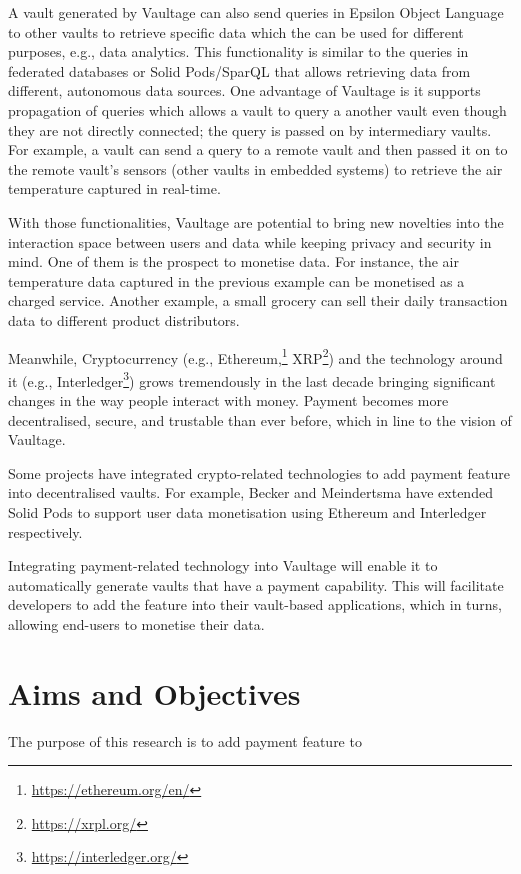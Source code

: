 \documentclass[]{article}
\begin{document}
A vault generated by Vaultage can also send queries in Epsilon Object Language \cite{epsilon} to other vaults to retrieve specific data which the can be used for different purposes, e.g., data analytics. This functionality is similar to the queries in federated databases \cite{db2} or Solid Pods/SparQL \cite{comunica} that allows retrieving data from different, autonomous data sources. One advantage of Vaultage is it supports propagation of queries which allows a vault to query a another vault even though they are not directly connected; the query is passed on by intermediary vaults. For example, a vault can send a query to a remote vault and then passed it on to the remote vault's sensors (other vaults in embedded systems) to retrieve the air temperature captured in real-time. 

With those functionalities, Vaultage are potential to bring new novelties into the interaction space between users and data while keeping privacy and security in mind. One of them  is the prospect to monetise data. For instance, the air temperature data captured in the previous example can be monetised as a charged service. Another example, a small grocery can sell their daily transaction data to different product distributors.  

Meanwhile, Cryptocurrency (e.g., Ethereum,\footnote{\url{https://ethereum.org/en/}} XRP\footnote{\url{https://xrpl.org/}}) and the technology around it (e.g., Interledger\footnote{\url{https://interledger.org/}})  grows tremendously in the last decade bringing significant changes in the way people interact with money. Payment becomes more decentralised, secure, and trustable than ever before, which in line to the vision of Vaultage.    

Some projects have integrated crypto-related technologies to add payment feature into decentralised vaults. For example, Becker \cite{becker2021monetising} and Meindertsma \cite{meindertsma2019web}  have extended Solid Pods to support user data monetisation using Ethereum and Interledger respectively. 

Integrating payment-related technology into Vaultage will enable it to automatically generate vaults that have a payment capability. This will facilitate developers to add the feature into their vault-based applications, which in turns, allowing end-users to monetise their data.   

\section{Aims and Objectives}
The purpose of this research is to add payment feature to 
\end{document}
